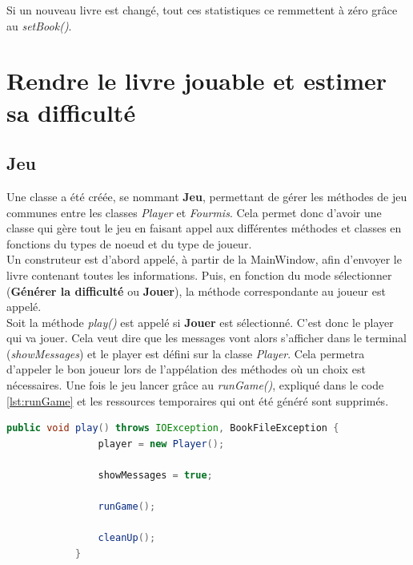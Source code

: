 		Si un nouveau livre est changé, tout ces statistiques ce remmettent à zéro grâce au \textit{setBook()}.



	\section{Rendre le livre jouable et estimer sa difficulté}\label{sec:Jeu}
		\subsection{Jeu}
		Une classe a été créée, se nommant \textbf{Jeu}, permettant de gérer les méthodes de jeu communes entre les classes \textit{Player} et \textit{Fourmis}. Cela permet donc d'avoir une classe qui gère tout le jeu en faisant appel aux différentes méthodes et classes en fonctions du types de noeud et du type de joueur. \\
		Un construteur est d'abord appelé, à partir de la MainWindow, afin d'envoyer le livre contenant toutes les informations. Puis, en fonction du mode sélectionner (\textbf{Générer la difficulté} ou \textbf{Jouer}), la méthode correspondante au joueur est appelé.\\

		Soit la méthode \textit{play()} est appelé si \textbf{Jouer} est sélectionné. C'est donc le player qui va jouer. Cela veut dire que les messages vont alors s'afficher dans le terminal (\textit{showMessages}) et le player est défini sur la classe \textit{Player}. Cela permetra d'appeler le bon joueur lors de l'appélation des méthodes où un choix est nécessaires.
		Une fois le jeu lancer grâce au \textit{runGame()}, expliqué dans le code \ref{lst:runGame} et les ressources temporaires qui ont été généré sont supprimés.

		\begin{lstlisting}[gobble=12, language=java, caption=play()]
			public void play() throws IOException, BookFileException {
				player = new Player();

				showMessages = true;

				runGame();

				cleanUp();
			}
		\end{lstlisting}

